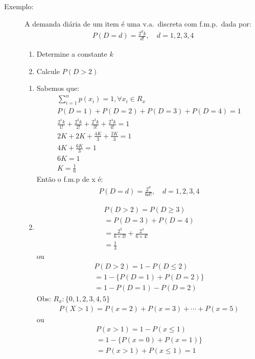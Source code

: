 \begin{description}
     \item [Exemplo:] A demanda diária de um item é uma v.a.\ discreta com f.m.p.\ dada por: 
       \begin{align}
         P(D=d)=\frac{2^d k}{d!},\quad d=1,2,3,4
       \end{align}
       \begin{enumerate}[label=(\alph*)]
         \item Determine a constante $k$
         \item Calcule $P(D>2)$
       \end{enumerate}
       \begin{enumerate}[label=(\alph*)]
         \item Sabemos que: 
           \begin{align*}
             \sum \limits^{n}_{i=1} p(x_i)=1, \forall x_i \in R_{x}\\
             P(D=1)+P(D=2)+P(D=3)+P(D=4)=1\\
             \frac{2^1 k}{1!}+\frac{2^2 k}{2!}+\frac{2^3 k}{3!}+\frac{2^4 k}{4!}=1\\
             2K + 2K+ \frac{4K}{3}+\frac{2K}{3}=1 \\
             4K+\frac{6K}{3}=1 \\
             6K=1\\
             K=\frac{1}{6}
           \end{align*}
           Então o f.m.p de x é: 
           \begin{align*}
             P(D=d)=\frac{2^d}{6d!},\quad d=1,2,3,4
           \end{align*}
         \item 
           \begin{align*}
             P(D>2)=P(D \geq 3) \\
             =P(D=3)+P(D=4)\\
             =\frac{2^3}{6\times 3!}+ \frac{2^4}{6\times 4!}\\
             =\frac{1}{3}
           \end{align*}
           ou 
           \begin{align*}
             P(D>2)=1-P(D\le 2)\\
             = 1- \{ P(D=1)+ P(D=2) \}\\
             = 1- P(D=1)- P(D=2)
           \end{align*}
           Obs: $R_{x}: \{0,1,2,3,4,5 \}$
           \begin{align*}
             P(X>1)=P(x=2)+ P(x=3)+\cdots+P(x=5)
           \end{align*}
           ou
           \begin{align*}
             P(x>1)= 1-P(x\le 1)\\
             = 1- \{ P(x=0)+ P(x=1) \}\\
             = P(x>1)+ P(x\le 1)=1
           \end{align*}
       \end{enumerate}
   \end{description}
